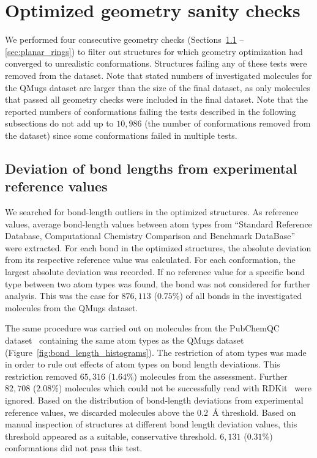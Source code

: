 \section{Optimized geometry sanity checks}
We performed four consecutive geometry checks (Sections~\ref{sec:bond_length_check} -- \ref{sec:planar_rings}) to filter out structures for which geometry optimization had converged to unrealistic conformations. Structures failing any of these tests were removed from the dataset. Note that stated numbers of investigated molecules for the QMugs dataset are larger than the size of the final dataset, as only molecules that passed all geometry checks were included in the final dataset. Note that the reported numbers of conformations failing the tests described in the following subsections do not add up to $10,986$ (the number of conformations removed from the dataset) since some conformations failed in multiple tests.

\subsection{Deviation of bond lengths from experimental reference values}
\label{sec:bond_length_check}

We searched for bond-length outliers in the optimized structures. As reference values, average bond-length values between atom types from ``Standard Reference Database, Computational Chemistry Comparison and Benchmark DataBase''~\cite{nist_database} were extracted. For each bond in the optimized structures, the absolute deviation from its respective reference value was calculated. For each conformation, the largest absolute deviation was recorded. If no reference value for a specific bond type between two atom types was found, the bond was not considered for further analysis. This was the case for $876,113$ ($0.75$\%) of all bonds in the investigated molecules from the QMugs dataset. 

The same procedure was carried out on molecules from the PubChemQC dataset~\cite{nakata2017pubchemqc} containing the same atom types as the QMugs dataset (Figure~\ref{fig:bond_length_histograms}). The restriction of atom types was made in order to rule out effects of atom types on bond length deviations. This restriction removed $65,316$ ($1.64$\%) molecules from the assessment. Further $82,708$ ($2.08$\%) molecules which could not be successfully read with RDKit~\cite{rdkit} were ignored. Based on the distribution of bond-length deviations from experimental reference values, we discarded molecules above the \SI{0.2}{\angstrom} threshold. Based on manual inspection of structures at different bond length deviation values, this threshold appeared as a suitable, conservative threshold. $6,131$ ($0.31$\%) conformations did not pass this test.

